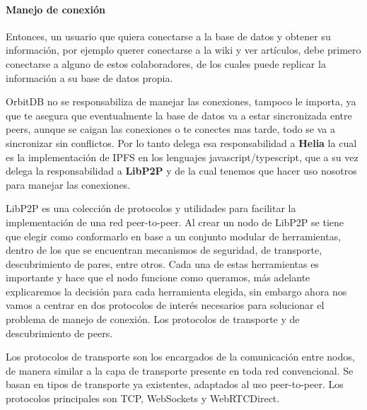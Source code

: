 \paragraph{Manejo de conexión}

Entonces, un usuario que quiera conectarse a la base de datos y obtener su información, por ejemplo querer conectarse a la wiki y ver artículos, debe primero conectarse a alguno de estos colaboradores, de los cuales puede replicar la información a su base de datos propia.

OrbitDB no se responsabiliza de manejar las conexiones, tampoco le importa, ya que te asegura que eventualmente la base de datos va a estar sincronizada entre peers, aunque se caigan las conexiones o te conectes mas tarde, todo se va a sincronizar sin conflictos. Por lo tanto delega esa responsabilidad a \textbf{Helia}\cite{helia} la cual es la implementación de IPFS en los lenguajes javascript/typescript, que a su vez delega la responsabilidad a \textbf{LibP2P}\cite{libp2p} y de la cual tenemos que hacer uso nosotros para manejar las conexiones.

LibP2P es una colección de protocolos y utilidades para facilitar la implementación de una red peer-to-peer. 
Al crear un nodo de LibP2P se tiene que elegir como conformarlo en base a un conjunto modular de herramientas,
dentro de los que se encuentran mecanismos de seguridad, de transporte, descubrimiento de pares, entre otros. Cada una de estas herramientas es importante y hace que el nodo funcione como queramos, más adelante explicaremos la decisión para cada herramienta elegida, sin embargo ahora nos vamos a centrar en dos protocolos de interés necesarios para solucionar el problema de manejo de conexión. Los protocolos de transporte y de descubrimiento de peers.

Los protocolos de transporte son los encargados de la comunicación entre nodos, de manera similar a la capa de transporte presente en toda red convencional. Se basan en tipos de transporte ya existentes, adaptados al uso peer-to-peer. Los protocolos principales son TCP, WebSockets y WebRTCDirect.

